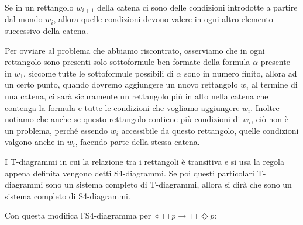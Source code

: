 \documentclass[a4paper, titlepage, 12pt]{report}
\begin{document}
Se in un rettangolo $w_{i+1}$ della catena ci sono delle condizioni introdotte
a partire dal mondo $w_i$, allora quelle condizioni devono valere
in ogni altro elemento successivo della catena.

Per ovviare al problema che abbiamo riscontrato, osserviamo che
in ogni rettangolo sono presenti solo
sottoformule ben formate della formula $\alpha$ presente in $w_1$,
siccome tutte le sottoformule possibili di $\alpha$ sono in numero finito,
allora ad un certo punto, quando dovremo aggiungere un nuovo rettangolo $w_i$
al termine di una catena, ci sarà sicuramente un rettangolo più in alto nella catena
che contenga la formula e tutte le condizioni che vogliamo aggiungere $w_i$.
Inoltre notiamo che anche se questo rettangolo contiene più condizioni di $w_i$,
ciò non è un problema, perché essendo $w_i$ accessibile da questo rettangolo,
quelle condizioni valgono anche in $w_i$, facendo parte della stessa catena.


I T-diagrammi in cui la relazione tra i rettangoli è transitiva e si usa la regola
appena definita vengono detti S4-diagrammi. Se poi questi particolari T-diagrammi
sono un sistema completo di T-diagrammi, allora si dirà che sono un sistema
completo di S4-diagrammi.

Con questa modifica l'S4-diagramma per $\diamond \Box p \rightarrow \Box \Diamond p$:
\end{document}
